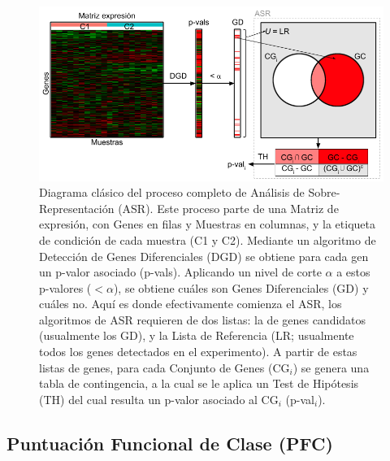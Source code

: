 \documentclass[12pt,twoside]{reedthesis}
\begin{document}
\newpage
\begin{figure}

{\centering \includegraphics[width=1\linewidth]{images/diagrama_ORA} 

}

\caption{Diagrama clásico del proceso completo de Análisis de Sobre-Representación (ASR). Este proceso parte de una Matriz de expresión, con Genes en filas y Muestras en columnas, y la etiqueta de condición de cada muestra (C1 y C2). Mediante un algoritmo de Detección de Genes Diferenciales (DGD) se obtiene para cada gen un p-valor asociado (p-vals). Aplicando un nivel de corte \(\alpha\) a estos p-valores (\(< \alpha\)), se obtiene cuáles son Genes Diferenciales (GD) y cuáles no. Aquí es donde efectivamente comienza el ASR, los algoritmos de ASR requieren de dos listas: la de genes candidatos (usualmente los GD), y la Lista de Referencia (LR; usualmente todos los genes detectados en el experimento). A partir de estas listas de genes, para cada Conjunto de Genes (CG\(_i\)) se genera una tabla de contingencia, a la cual se le aplica un Test de Hipótesis (TH) del cual resulta un p-valor asociado al CG\(_i\) (p-val\(_i\)).}\label{fig:diagramaORA}
\end{figure}


\hypertarget{puntuaciuxf3n-funcional-de-clase-pfc}{%
\subsection{Puntuación Funcional de Clase (PFC)}\label{puntuaciuxf3n-funcional-de-clase-pfc}}
\end{document}
